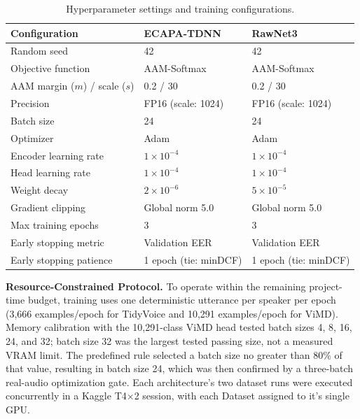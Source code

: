 \begin{table}[H]
\centering
\footnotesize
\renewcommand{\arraystretch}{1.0}
\begin{tabular}{lll}
\toprule
\textbf{Configuration} & \textbf{ECAPA-TDNN} & \textbf{RawNet3} \\
\midrule
Random seed           & 42                  & 42 \\
Objective function    & AAM-Softmax         & AAM-Softmax \\
AAM margin ($m$) / scale ($s$) & 0.2 / 30   & 0.2 / 30 \\
Precision             & FP16 (scale: 1024)  & FP16 (scale: 1024) \\
Batch size            & 24                  & 24 \\
Optimizer             & Adam                & Adam \\
Encoder learning rate & $1\times 10^{-4}$   & $1\times 10^{-4}$ \\
Head learning rate    & $1\times 10^{-4}$   & $1\times 10^{-4}$ \\
Weight decay          & $2\times 10^{-6}$   & $5\times 10^{-5}$ \\
Gradient clipping     & Global norm 5.0     & Global norm 5.0 \\
Max training epochs   & 3                   & 3 \\
Early stopping metric & Validation EER      & Validation EER \\
Early stopping patience & 1 epoch (tie: minDCF) & 1 epoch (tie: minDCF) \\
\bottomrule
\end{tabular}
\caption{Hyperparameter settings and training configurations.}
\label{tab:training-hyperparams}
\end{table}

\textbf{Resource-Constrained Protocol.} To operate within the remaining project-time budget, training uses one deterministic utterance per speaker per epoch (3{,}666 examples/epoch for TidyVoice and 10{,}291 examples/epoch for ViMD). Memory calibration with the 10{,}291-class ViMD head tested batch sizes 4, 8, 16, 24, and 32; batch size 32 was the largest tested passing size, not a measured VRAM limit. The predefined rule selected a batch size no greater than 80\% of that value, resulting in batch size 24, which was then confirmed by a three-batch real-audio optimization gate. Each architecture's two dataset runs were executed concurrently in a Kaggle T4$\times$2 session, with each Dataset assigned to it's single GPU.

